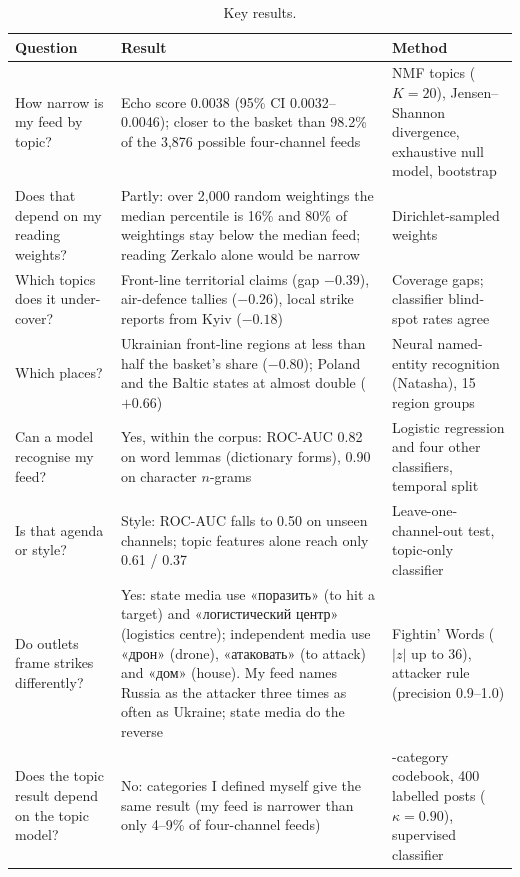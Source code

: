 \documentclass[11pt,a4paper]{article}
\newcommand{\ru}[2]{«#1» (#2)}
\begin{document}
\begin{table}[H]
\centering
\small
\caption{Key results.}
\label{tab:key}
\begin{tabularx}{\textwidth}{>{\raggedright\arraybackslash}p{3.3cm}>{\raggedright\arraybackslash}X>{\raggedright\arraybackslash}p{3.6cm}}
\toprule
Question & Result & Method \\
\midrule
How narrow is my feed by topic? & Echo score 0.0038 (95\% CI 0.0032--0.0046); closer to the basket than 98.2\% of the 3,876 possible four-channel feeds & NMF topics ($K=20$), Jensen--Shannon divergence, exhaustive null model, bootstrap \\
\midrule
Does that depend on my reading weights? & Partly: over 2,000 random weightings the median percentile is 16\% and 80\% of weightings stay below the median feed; reading Zerkalo alone would be narrow & Dirichlet-sampled weights \\
\midrule
Which topics does it under-cover? & Front-line territorial claims (gap $-0.39$), air-defence tallies ($-0.26$), local strike reports from Kyiv ($-0.18$) & Coverage gaps; classifier blind-spot rates agree \\
\midrule
Which places? & Ukrainian front-line regions at less than half the basket's share ($-0.80$); Poland and the Baltic states at almost double ($+0.66$) & Neural named-entity recognition (Natasha), 15 region groups \\
\midrule
Can a model recognise my feed? & Yes, within the corpus: ROC-AUC 0.82 on word lemmas (dictionary forms), 0.90 on character $n$-grams & Logistic regression and four other classifiers, temporal split \\
\midrule
Is that agenda or style? & Style: ROC-AUC falls to 0.50 on unseen channels; topic features alone reach only 0.61 / 0.37 & Leave-one-channel-out test, topic-only classifier \\
\midrule
Do outlets frame strikes differently? & Yes: state media use \ru{поразить}{to hit a target} and \ru{логистический центр}{logistics centre}; independent media use \ru{дрон}{drone}, \ru{атаковать}{to attack} and \ru{дом}{house}. My feed names Russia as the attacker three times as often as Ukraine; state media do the reverse & Fightin' Words ($|z|$ up to 36), attacker rule (precision 0.9--1.0) \\
\midrule
Does the topic result depend on the topic model? & No: categories I defined myself give the same result (my feed is narrower than only 4--9\% of four-channel feeds) & 14-category codebook, 400 labelled posts ($\kappa=0.90$), supervised classifier \\
\bottomrule
\end{tabularx}
\end{table}
\end{document}
